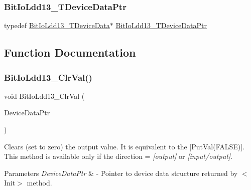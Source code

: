 \subsubsection{\texorpdfstring{Bit\+Io\+Ldd13\+\_\+\+T\+Device\+Data\+Ptr}{BitIoLdd13\_TDeviceDataPtr}}
{\footnotesize\ttfamily typedef \hyperlink{struct_bit_io_ldd13___t_device_data}{Bit\+Io\+Ldd13\+\_\+\+T\+Device\+Data}$\ast$ \hyperlink{group___bit_io_ldd13__module_ga42e669f48bfa755a4f674b03aa227551}{Bit\+Io\+Ldd13\+\_\+\+T\+Device\+Data\+Ptr}}



\subsection{Function Documentation}
\mbox{\label{group___bit_io_ldd13__module_gad416cb8b9b15c2afb948ef359da7140d}} 
\subsubsection{\texorpdfstring{Bit\+Io\+Ldd13\+\_\+\+Clr\+Val()}{BitIoLdd13\_ClrVal()}}
{\footnotesize\ttfamily void Bit\+Io\+Ldd13\+\_\+\+Clr\+Val (\begin{DoxyParamCaption}\item[{\hyperlink{group___p_e___types__module_gac5cf1362f1f0e3a2ce71b1bf2276d091}{L\+D\+D\+\_\+\+T\+Device\+Data} $\ast$}]{Device\+Data\+Ptr }\end{DoxyParamCaption})}



Clears (set to zero) the output value. It is equivalent to the \mbox{[}Put\+Val(\+F\+A\+L\+S\+E)\mbox{]}. This method is available only if the direction = {\itshape \mbox{[}output\mbox{]}} or {\itshape \mbox{[}input/output\mbox{]}}. 


\begin{DoxyParams}{Parameters}
{\em Device\+Data\+Ptr} & -\/ Pointer to device data structure returned by $<$\+Init$>$ method. \\
\hline
\end{DoxyParams}
\mbox{\label{group___bit_io_ldd13__module_ga91a8447c1b3c4ab44bfa626ee06b0175}} 
